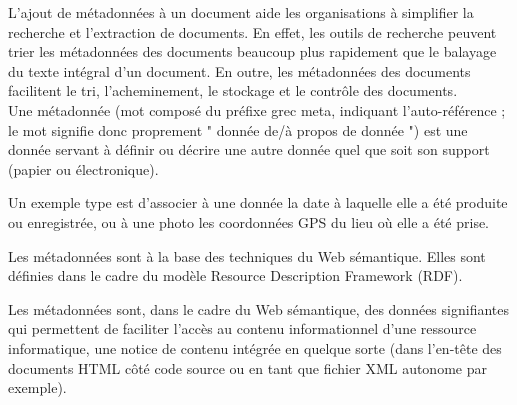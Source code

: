 \documentclass[12pt]{report}
\begin{document}
L'ajout de métadonnées à un document aide les organisations à simplifier la recherche et l'extraction de documents. En effet, les outils de recherche peuvent trier les métadonnées des documents beaucoup plus rapidement que le balayage du texte intégral d'un document. En outre, les métadonnées des documents facilitent le tri, l'acheminement, le stockage et le contrôle des documents\cite{14}.
\\

Une métadonnée (mot composé du préfixe grec meta, indiquant l'auto-référence ; le mot signifie donc proprement " donnée de/à propos de donnée ") est une donnée servant à définir ou décrire une autre donnée quel que soit son support (papier ou électronique).

Un exemple type est d'associer à une donnée la date à laquelle elle a été produite ou enregistrée, ou à une photo les coordonnées GPS du lieu où elle a été prise.

Les métadonnées sont à la base des techniques du Web sémantique. Elles sont définies dans le cadre du modèle Resource Description Framework (RDF).

Les métadonnées sont, dans le cadre du Web sémantique, des données signifiantes qui permettent de faciliter l'accès au contenu informationnel d'une ressource informatique, une notice de contenu intégrée en quelque sorte (dans l'en-tête des documents HTML côté code source ou en tant que fichier XML autonome par exemple)\cite{15}.\\
\end{document}
